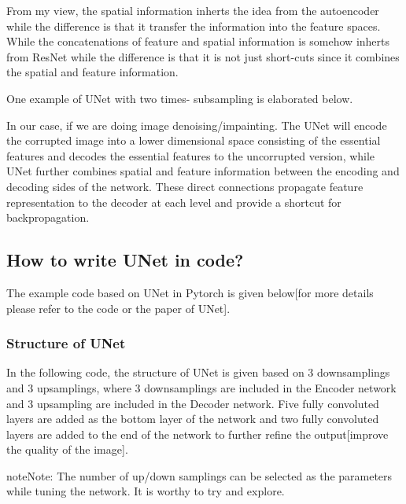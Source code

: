 \documentclass[letterpaper,10pt,english]{sphinxmanual}
\let\sphinxpxdimen\pdfpxdimen\else\newdimen\sphinxpxdimen
\begin{document}
From my view, the spatial information inherts the idea from the autoencoder while the difference is that it transfer the information into the feature spaces. While the concatenations of feature and spatial information is somehow inherts from ResNet while the difference is that it is not just short-cuts since it combines the spatial and feature information.

One example of UNet with two times- subsampling is elaborated below.

\noindent{\hspace*{\fill}\sphinxincludegraphics[width=500\sphinxpxdimen]{{unet}.png}\hspace*{\fill}}

In our case, if we are doing image denoising/impainting. The UNet will encode the corrupted image into a lower dimensional space consisting of the essential features and decodes the essential features to the uncorrupted version, while UNet further combines spatial and feature information between the encoding and decoding sides of the network. These direct connections propagate feature representation to the decoder at each level and provide a shortcut for backpropagation.


\subsection{How to write UNet in code?}
\label{\detokenize{usage/quickstart:how-to-write-unet-in-code}}
The example code based on UNet in Pytorch is given below{[}for more details please refer to the code or the paper of UNet{]}.


\subsubsection{Structure of UNet}
\label{\detokenize{usage/quickstart:structure-of-unet}}
In the following code, the structure of UNet is given based on 3 downsamplings and 3 upsamplings, where 3 downsamplings are included in the Encoder network and 3 upsampling are included in the Decoder network. Five fully convoluted layers are added as the bottom layer of the network and two fully convoluted layers are added to the end of the network to further refine the output{[}improve the quality of the image{]}.

\begin{sphinxadmonition}{note}{Note:}
The number of up/down samplings can be selected as the parameters while tuning the network. It is worthy to try and explore.
\end{sphinxadmonition}
\end{document}
